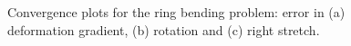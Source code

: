 \documentclass[12pt]{article}
\begin{document}
\begin{figure}[htbp]
  \begin{center}
    \unitlength=1.0mm
    \caption{Convergence plots for the ring bending problem: error in
      (a) deformation gradient, (b) rotation and (c) right stretch.}
    \label{fig:ring-refinement}
  \end{center}
\end{figure}
\end{document}
